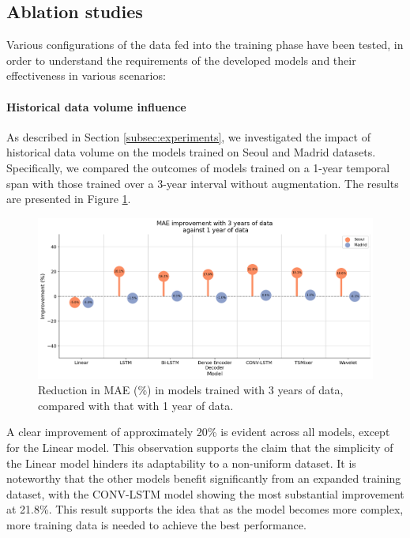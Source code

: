 \subsection{Ablation studies}

Various configurations of the data fed into the training phase have been tested, in order to understand the requirements of the developed models and their effectiveness in various scenarios:

\paragraph{Historical data volume influence}

As described in Section \ref{subsec:experiments}, we investigated the impact of historical data volume on the models trained on Seoul and Madrid datasets. Specifically, we compared the outcomes of models trained on a 1-year temporal span with those trained over a 3-year interval without augmentation. The results are presented in Figure \ref{fig:more_data_improv}.

\begin{figure}[h]
    \centering
    \includegraphics[width=1\linewidth]{images/improvement with more data.png}
    \caption{Reduction in MAE (\%) in models trained with 3 years of data, compared with that with 1 year of data.}
    \label{fig:more_data_improv}
\end{figure}

A clear improvement of approximately 20\% is evident across all models, except for the Linear model. This observation supports the claim that the simplicity of the Linear model hinders its adaptability to a non-uniform dataset. It is noteworthy that the other models benefit significantly from an expanded training dataset, with the CONV-LSTM model showing the most substantial improvement at 21.8\%. This result supports the idea that as the model becomes more complex, more training data is needed to achieve the best performance.

